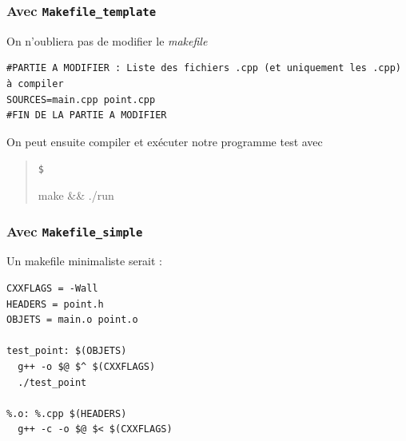 \documentclass{book}
\newenvironment{prompt}{\begin{quote}\color{blue!75}\tt\$\,
}{\end{quote}}
\def\filename{\emph}
\begin{document}
\begin{correction}
\subsubsection*{Avec \texttt{Makefile\_template}}

On n'oubliera pas de modifier le \filename{makefile} 
\begin{verbatim}
#PARTIE A MODIFIER : Liste des fichiers .cpp (et uniquement les .cpp) à compiler
SOURCES=main.cpp point.cpp
#FIN DE LA PARTIE A MODIFIER
\end{verbatim}

On peut ensuite compiler et exécuter notre programme test avec
\begin{prompt}
make \&\& ./run
\end{prompt}

\subsubsection*{Avec \texttt{Makefile\_simple}}

Un makefile minimaliste serait :

\begin{verbatim}
CXXFLAGS = -Wall
HEADERS = point.h
OBJETS = main.o point.o

test_point: $(OBJETS)
  g++ -o $@ $^ $(CXXFLAGS)
  ./test_point

%.o: %.cpp $(HEADERS)
  g++ -c -o $@ $< $(CXXFLAGS)
\end{verbatim}


\end{correction}
\end{document}
